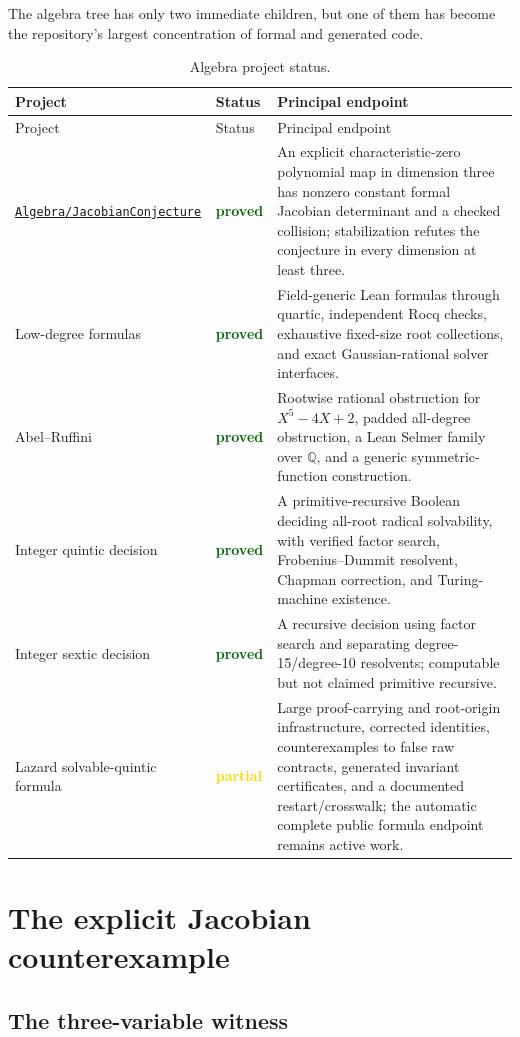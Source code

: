 \documentclass[
  10pt,
  a4paper,
  twoside,
  open=any,
  parskip=half,
  headings=big
]{scrreprt}
\newcommand{\CommitFull}{56a402bf82a9aab119fcbe3e96b991d387b221c5}
\newcommand{\RepoWeb}{https://github.com/VladimirReshetnikov/ProveIt}
\newcommand{\RepoTreeBase}{\RepoWeb/tree/\CommitFull}
\newcommand{\RepoDir}[1]{\href{\RepoTreeBase/#1}{\nolinkurl{#1}}}
\newcommand{\yes}{\textcolor{darkgreen}{\textbf{proved}}}
\newcommand{\partialstatus}{\textcolor{gold}{\textbf{partial}}}
\begin{document}
The algebra tree has only two immediate children, but one of them has become the repository's largest concentration of formal and generated code.

\begin{longtable}{@{}L{39mm}L{31mm}L{84mm}@{}}
\caption{Algebra project status.}\label{tab:algebra-status}\\
\toprule
Project & Status & Principal endpoint \\
\midrule
\endfirsthead
\toprule
Project & Status & Principal endpoint \\
\midrule
\endhead
\bottomrule
\endfoot
\RepoDir{Algebra/JacobianConjecture} & \yes & An explicit characteristic-zero polynomial map in dimension three has nonzero constant formal Jacobian determinant and a checked collision; stabilization refutes the conjecture in every dimension at least three. \\
Low-degree formulas & \yes & Field-generic Lean formulas through quartic, independent Rocq checks, exhaustive fixed-size root collections, and exact Gaussian-rational solver interfaces. \\
Abel--Ruffini & \yes & Rootwise rational obstruction for \(X^5-4X+2\), padded all-degree obstruction, a Lean Selmer family over \(\mathbb Q\), and a generic symmetric-function construction. \\
Integer quintic decision & \yes & A primitive-recursive Boolean deciding all-root radical solvability, with verified factor search, Frobenius--Dummit resolvent, Chapman correction, and Turing-machine existence. \\
Integer sextic decision & \yes & A recursive decision using factor search and separating degree-15/degree-10 resolvents; computable but not claimed primitive recursive. \\
Lazard solvable-quintic formula & \partialstatus & Large proof-carrying and root-origin infrastructure, corrected identities, counterexamples to false raw contracts, generated invariant certificates, and a documented restart/crosswalk; the automatic complete public formula endpoint remains active work. \\
\end{longtable}

\section{The explicit Jacobian counterexample}

\subsection{The three-variable witness}
\end{document}
